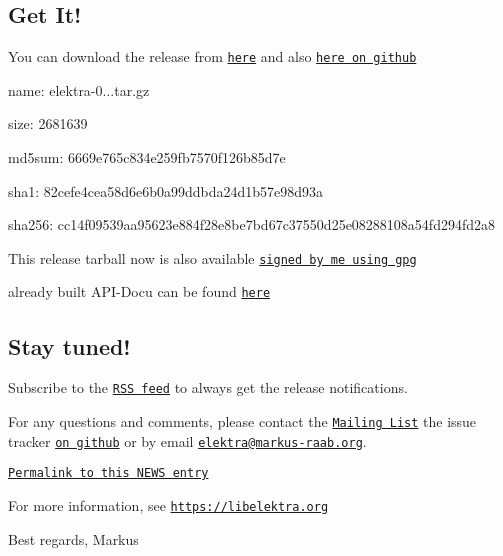 \subsection*{Get It!}

You can download the release from \href{https://www.libelektra.org/ftp/elektra/releases/elektra-0.8.19.tar.gz}{\tt here} and also \href{https://github.com/ElektraInitiative/ftp/tree/master/releases/elektra-0.8.19.tar.gz}{\tt here on github}


\begin{DoxyItemize}
\item name\+: elektra-\/0...\+tar.\+gz
\item size\+: 2681639
\item md5sum\+: 6669e765c834e259fb7570f126b85d7e
\item sha1\+: 82cefe4cea58d6e6b0a99ddbda24d1b57e98d93a
\item sha256\+: cc14f09539aa95623e884f28e8be7bd67c37550d25e08288108a54fd294fd2a8
\end{DoxyItemize}

This release tarball now is also available \href{https://www.libelektra.org/ftp/elektra/releases/elektra-0.8.19.tar.gz.gpg}{\tt signed by me using gpg}

already built A\+P\+I-\/\+Docu can be found \href{https://doc.libelektra.org/api/0.8.19/html/}{\tt here}

\subsection*{Stay tuned!}

Subscribe to the \href{https://doc.libelektra.org/news/feed.rss}{\tt R\+SS feed} to always get the release notifications.

For any questions and comments, please contact the \href{https://lists.sourceforge.net/lists/listinfo/registry-list}{\tt Mailing List} the issue tracker \href{https://git.libelektra.org/issues}{\tt on github} or by email \href{mailto:elektra@markus-raab.org}{\tt elektra@markus-\/raab.\+org}.

\href{https://doc.libelektra.org/news/8e05231a-4f3d-488b-8dc2-5f0d5c474c39.html}{\tt Permalink to this N\+E\+WS entry}

For more information, see \href{https://libelektra.org}{\tt https\+://libelektra.\+org}

Best regards, Markus 